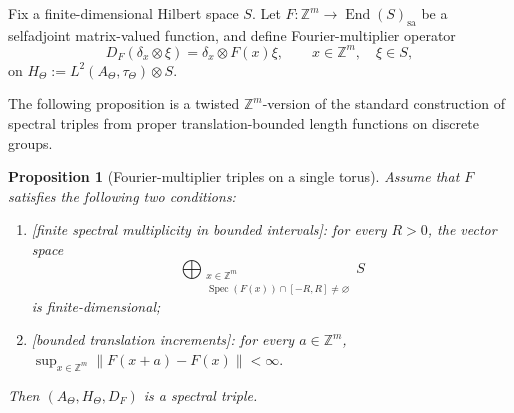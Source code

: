 \documentclass[11pt]{amsart}
\newtheorem{proposition}[theorem]{Proposition}
\theoremstyle{definition}
\theoremstyle{remark}
\newcommand{\Z}{\mathbb{Z}}
\begin{document}
Fix a finite-dimensional Hilbert space \(S\).
Let $F\colon \Z^m\longrightarrow \operatorname{End}(S)_{\mathrm{sa}}$
be a selfadjoint matrix-valued function, and define  Fourier-multiplier operator
\[
D_F(\delta_x\otimes\xi)=\delta_x\otimes F(x)\xi,
\qquad x\in\Z^m,\quad \xi\in S,
\]
on $H_\Theta:=L^2(A_\Theta,\tau_\Theta)\otimes S$. 

The following proposition is a twisted
$\mathbb Z^m$-version of the standard construction of spectral triples from
proper translation-bounded length functions on discrete groups.


\begin{proposition}[Fourier-multiplier triples on a single torus]
\label{prop:single-torus-fourier-multiplier}
Assume that $F$ satisfies the following two conditions:

\begin{enumerate}
\item[\emph{(a)}]
\emph{ [finite spectral multiplicity in bounded intervals]:} for every
$R>0$, the vector space
\[
\bigoplus_{\substack{x\in\Z^m\\
\operatorname{Spec}(F(x))\cap[-R,R]\neq\varnothing}}
S
\]
is finite-dimensional;

\item[\emph{(b)}]
\emph{[bounded translation increments]:} for every $a\in\Z^m$, $\sup_{x\in\Z^m}\|F(x+a)-F(x)\|<\infty.$
\end{enumerate}
\smallskip

\noindent
Then $(A_\Theta,H_\Theta,D_F)$
is a spectral triple. 
\end{proposition}
\end{document}
